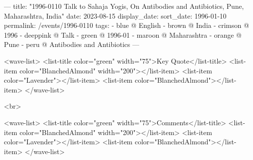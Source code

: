---
title: "1996-0110 Talk to Sahaja Yogis, On Antibodies and Antibiotics, Pune, Maharashtra, India"
date: 2023-08-15
display_date: 
sort_date: 1996-01-10
permalink: /events/1996-0110
tags:
  - blue @ English
  - brown @ India
  - crimson @ 1996
  - deeppink @ Talk
  - green @ 1996-01
  - maroon @ Maharashtra
  - orange @ Pune
  - peru @ Antibodies and Antibiotics
---

<wave-list>
  <list-title color="green" width="75">Key Quote</list-title>
  <list-item color="BlanchedAlmond"  width="200"></list-item>
  <list-item color="Lavender"></list-item>
  <list-item color="BlanchedAlmond"></list-item>
</wave-list>

<br>

<wave-list>
  <list-title color="green" width="75">Comments</list-title>
  <list-item color="BlanchedAlmond"  width="200"></list-item>
  <list-item color="Lavender"></list-item>
  <list-item color="BlanchedAlmond"></list-item>
</wave-list>